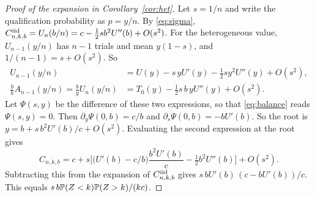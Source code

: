 \begin{proof}[Proof of the expansion in Corollary~\ref{cor:het}]
Let $s=1/n$ and write the qualification probability as $p=y/n$. By \eqref{eq:sigma}, $C^{\rm iid}_{n,k,b}=U_n(b/n)=c-\tfrac12 sb^2U''(b)+O(s^2)$. For the heterogeneous value, $U_{n-1}(y/n)$ has $n-1$ trials and mean $y(1-s)$, and $1/(n-1)=s+O(s^2)$. So
\begin{align*}
 U_{n-1}(y/n)&=U(y)-s\,yU'(y)-\tfrac12sy^2U''(y)+O(s^2),\\
 \frac bkA_{n-1}(y/n)=\frac byU_n(y/n)&=T_0(y)-\tfrac12 s\,b\,yU''(y)+O(s^2).
\end{align*}
Let $\Psi(s,y)$ be the difference of these two expressions, so that \eqref{eq:balance} reads $\Psi(s,y)=0$. Then $\partial_y\Psi(0,b)=c/b$ and $\partial_s\Psi(0,b)=-bU'(b)$. So the root is $y=b+s\,b^2U'(b)/c+O(s^2)$. Evaluating the second expression at the root gives
\[
 C_{n,k,b}=c+s\Big[\big(U'(b)-c/b\big)\frac{b^2U'(b)}{c}-\tfrac12 b^2U''(b)\Big]+O(s^2).
\]
Subtracting this from the expansion of $C^{\rm iid}_{n,k,b}$ gives $s\,bU'(b)\,(c-bU'(b))/c$. This equals $s\,b\mathbb P(Z<k)\mathbb P(Z>k)/(kc)$.
\end{proof}
